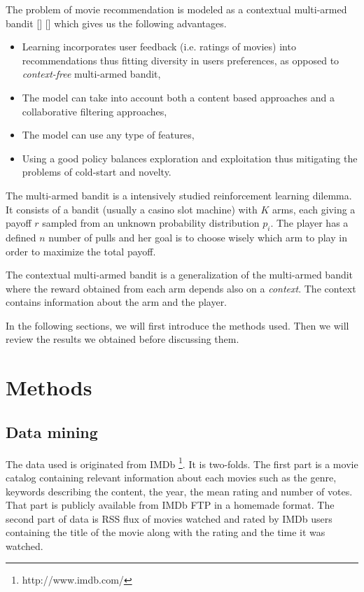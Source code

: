 \documentclass[letterpaper]{article}
\begin{document}
The problem of movie recommendation is modeled as a contextual multi-armed bandit [\cite{sutton1998reinforcement}] [\cite{lu2010contextual}] which gives us the following advantages.

\begin{itemize}
	\item Learning incorporates user feedback (i.e. ratings of movies) into recommendations thus fitting diversity in users preferences, as opposed to \textit{context-free} multi-armed bandit,
	\item The model can take into account both a content based approaches and a collaborative filtering approaches,
	\item The model can use any type of features,
	\item Using a good policy balances exploration and exploitation thus mitigating the problems of cold-start and novelty.
\end{itemize}

The multi-armed bandit is a intensively studied reinforcement learning dilemma. It consists of a bandit (usually a casino slot machine) with $K$ arms, each giving a payoff $r$ sampled from an unknown probability distribution $p_{i}$. The player has a defined $n$ number of pulls and her goal is to choose wisely which arm to play in order to maximize the total payoff.

The contextual multi-armed bandit is a generalization of the multi-armed bandit where the reward obtained from each arm depends also on a \textit{context}. The context contains information about the arm and the player.


In the following sections, we will first introduce the methods used. Then we will review the results we obtained before discussing them.

\section{Methods}

\subsection{Data mining}

The data used is originated from IMDb \footnote{http://www.imdb.com/}. It is two-folds. The first part is a movie catalog containing relevant information about each movies such as the genre, keywords describing the content, the year, the mean rating and number of votes. That part is publicly available from IMDb FTP in a homemade format. The second part of data is RSS flux of movies watched and rated by IMDb users containing the title of the movie along with the rating and the time it was watched.
\end{document}

